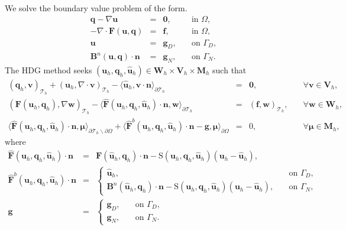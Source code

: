 \documentclass[11pt]{article}
\begin{document}
We solve the boundary value problem of the form.
\begin{equation}
\begin{array}{rcll}
\bm{q} - \nabla \bm{u}  & = & \bm{0} , & \quad \mbox{in } \Omega, \\
- \nabla \cdot \bm{F} (\bm{u},\bm{q}) & = & \bm{f}, & \quad \mbox{in } \Omega, \\
\bm{u} & = & \bm{g}_D, & \quad \mbox{on } \Gamma_D , \\
\bm{B}^n(\bm{u},\bm{q}) \cdot \bm{n} & = & \bm{g}_N, & \quad \mbox{on } \Gamma_N .
\end{array}
\end{equation}
The HDG method seeks $(\bm{u}_h,\bm{q}_h,\widehat{\bm{u}}_h) \in \bm{W}_h \times \bm{V}_h \times \bm{M}_h$ such that
\begin{equation}
\begin{array}{rcll}
(\bm{q}_h, \bm{v})_{\mathcal{T}_h} + (\bm{u}_h, \nabla \cdot \bm{v})_{\mathcal{T}_h} - \langle \widehat{\bm{u}}_h, \bm{v} \cdot \bm{n} \rangle_{\partial \mathcal{T}_h}  & = & \bm{0}, & \quad \forall \bm{v} \in \bm{V}_h, \\[2ex] 
(\bm{F} (\bm{u}_h,\bm{q}_h), \nabla \bm{w})_{\mathcal{T}_h} - \langle \widehat{\bm{F}} (\bm{u}_h, \bm{q}_h,\widehat{\bm{u}}_h) \cdot \bm{n}, \bm{w} \rangle_{\partial \mathcal{T}_h} & = & (\bm{f}, \bm{w})_{\mathcal{T}_h}, & \quad \forall \bm{w} \in \bm{W}_h, \\[2ex]
\langle \widehat{\bm{F}} (\bm{u}_h,\bm{q}_h, \widehat{\bm{u}}_h) \cdot \bm{n}, \bm{\mu} \rangle_{\partial \mathcal{T}_h \backslash \partial \Omega} + \langle \widehat{\bm{F}}^b(\bm{u}_h, \bm{q}_h, \widehat{\bm{u}}_h) \cdot \bm{n} - \bm{g}, \bm{\mu} \rangle_{\partial \Omega}  & = & 0, & \quad \forall \bm{\mu} \in \bm{M}_h ,
\end{array}
\end{equation}
where
\begin{equation}
\begin{array}{rcll}
\widehat{\bm{F}} (\bm{u}_h, \bm{q}_h, \widehat{\bm{u}}_h) \cdot \bm{n} & = & {\bm{F}} (\widehat{\bm{u}}_h,\bm{q}_h) \cdot \bm{n} - \bm{\mathrm{S}} (\bm{u}_h, \bm{q}_h, \widehat{\bm{u}}_h) (\bm{u}_h - \widehat{\bm{u}}_h), \\[2ex]
\widehat{\bm{F}}^b(\bm{u}_h, \bm{q}_h, \widehat{\bm{u}}_h) \cdot \bm{n} & = & 
\left\{
\begin{array}{ll} 
\widehat{\bm{u}}_h, & \quad  \mbox{on } \Gamma_D, \\
\bm{B}^n(\widehat{\bm{u}}_h,\bm{q}_h) \cdot \bm{n} -\bm{\mathrm{S}} (\bm{u}_h, \bm{q}_h,\widehat{\bm{u}}_h) (\bm{u}_h - \widehat{\bm{u}}_h), & \quad \mbox{on }   \Gamma_N,  
\end{array}
\right. \\[3ex]
\bm{g} & = & 
\left\{
\begin{array}{ll} 
\bm{g}_D, & \quad  \mbox{on } \Gamma_D, \\
\bm{g}_N, & \quad \mbox{on }   \Gamma_N .  
\end{array}
\right.
\end{array}
\end{equation}
\end{document}
